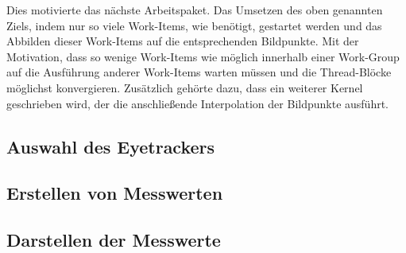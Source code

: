 Dies motivierte das nächste Arbeitspaket.
Das Umsetzen des oben genannten Ziels, indem nur so viele Work-Items, wie benötigt, gestartet werden und das Abbilden dieser Work-Items auf die entsprechenden Bildpunkte.
Mit der Motivation, dass so wenige Work-Items wie möglich innerhalb einer Work-Group auf die Ausführung anderer Work-Items warten müssen und die Thread-Blöcke möglichst konvergieren.
Zusätzlich gehörte dazu, dass ein weiterer Kernel geschrieben wird, der die anschließende Interpolation der Bildpunkte ausführt.


\subsection*{Auswahl des Eyetrackers}

\subsection*{Erstellen von Messwerten}

\subsection*{Darstellen der Messwerte}

